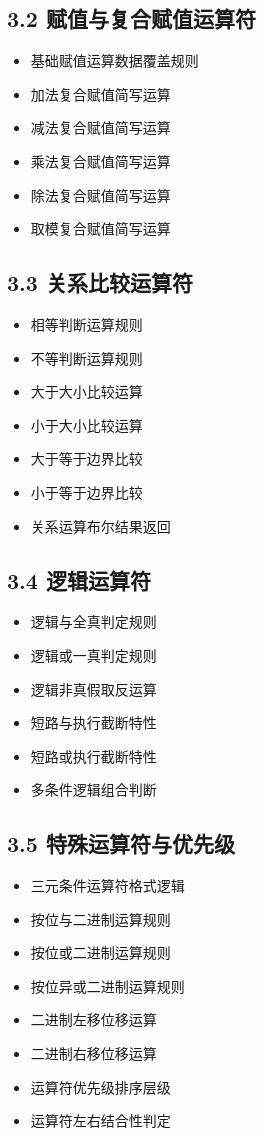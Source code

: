 \subsection{3.2 赋值与复合赋值运算符}
\begin{itemize}
\item 基础赋值运算数据覆盖规则
\item 加法复合赋值简写运算
\item 减法复合赋值简写运算
\item 乘法复合赋值简写运算
\item 除法复合赋值简写运算
\item 取模复合赋值简写运算
\end{itemize}

\subsection{3.3 关系比较运算符}
\begin{itemize}
\item 相等判断运算规则
\item 不等判断运算规则
\item 大于大小比较运算
\item 小于大小比较运算
\item 大于等于边界比较
\item 小于等于边界比较
\item 关系运算布尔结果返回
\end{itemize}

\subsection{3.4 逻辑运算符}
\begin{itemize}
\item 逻辑与全真判定规则
\item 逻辑或一真判定规则
\item 逻辑非真假取反运算
\item 短路与执行截断特性
\item 短路或执行截断特性
\item 多条件逻辑组合判断
\end{itemize}

\subsection{3.5 特殊运算符与优先级}
\begin{itemize}
\item 三元条件运算符格式逻辑
\item 按位与二进制运算规则
\item 按位或二进制运算规则
\item 按位异或二进制运算规则
\item 二进制左移位移运算
\item 二进制右移位移运算
\item 运算符优先级排序层级
\item 运算符左右结合性判定
\end{itemize}

